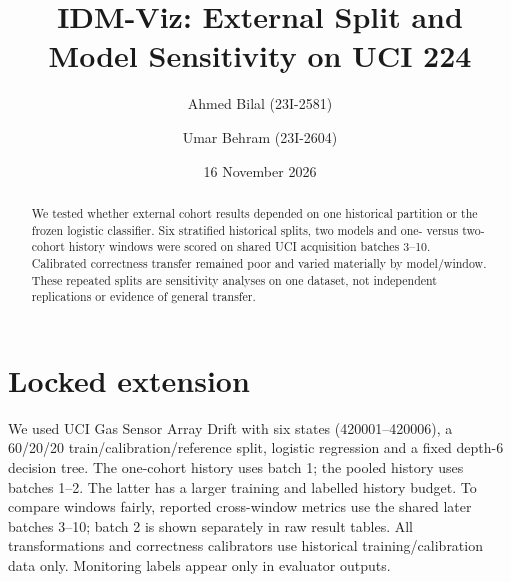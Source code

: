 \documentclass[10pt,a4paper]{article}
\title{IDM-Viz: External Split and Model Sensitivity on UCI 224}
\author{Ahmed Bilal (23I-2581) \and Umar Behram (23I-2604)}\date{16 November 2026}
\begin{document}
\maketitle
\begin{abstract}
We tested whether external cohort results depended on one historical partition or the frozen logistic classifier. Six stratified historical splits, two models and one- versus two-cohort history windows were scored on shared UCI acquisition batches 3--10. Calibrated correctness transfer remained poor and varied materially by model/window. These repeated splits are sensitivity analyses on one dataset, not independent replications or evidence of general transfer.
\end{abstract}
\section{Locked extension}
We used UCI Gas Sensor Array Drift with six states (420001--420006), a 60/20/20 train/calibration/reference split, logistic regression and a fixed depth-6 decision tree. The one-cohort history uses batch 1; the pooled history uses batches 1--2. The latter has a larger training and labelled history budget. To compare windows fairly, reported cross-window metrics use the shared later batches 3--10; batch 2 is shown separately in raw result tables. All transformations and correctness calibrators use historical training/calibration data only. Monitoring labels appear only in evaluator outputs.
\end{document}
